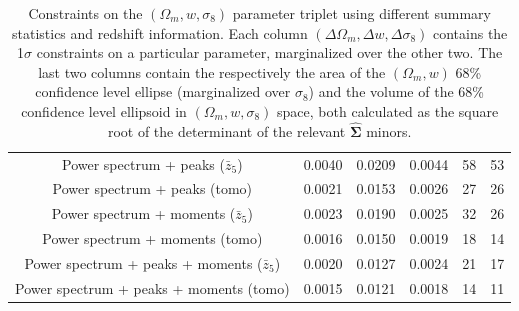 \documentclass[reprint,aps,prd,superscriptaddress,showkeys,showpacs]{revtex4-1}
\newcommand{\bbh}[1]{\mathbf{\hat{#1}}}
\begin{document}
\begin{table}
\begin{tabular}{c|c|c|c|c|c|}
           Power spectrum + peaks ($\bar{z}_5$) &            0.0040 &     0.0209 &            0.0044 &                            58 &                                         53 \\
                  Power spectrum + peaks (tomo) &            0.0021 &     0.0153 &            0.0026 &                            27 &                                         26 \\
         Power spectrum + moments ($\bar{z}_5$) &            0.0023 &     0.0190 &            0.0025 &                            32 &                                         26 \\
                Power spectrum + moments (tomo) &            0.0016 &     0.0150 &            0.0019 &                            18 &                                         14 \\
 Power spectrum + peaks + moments ($\bar{z}_5$) &            0.0020 &     0.0127 &            0.0024 &                            21 &                                         17 \\
        Power spectrum + peaks + moments (tomo) &            0.0015 &     0.0121 &            0.0018 &                            14 &                                         11 \\ \hline
\bottomrule
\end{tabular}
\caption{Constraints on the $(\Omega_m,w,\sigma_8)$ parameter triplet using different summary statistics and redshift information. Each column $(\Delta \Omega_m,\Delta w,\Delta \sigma_8)$ contains the 1$\sigma$ constraints on a particular parameter, marginalized over the other two. The last two columns contain the respectively the area of the $(\Omega_m,w)$ 68\% confidence level ellipse (marginalized over $\sigma_8$) and the volume of the 68\% confidence level ellipsoid in $(\Omega_m,w,\sigma_8)$ space, both calculated as the square root of the determinant of the relevant $\bbh{\Sigma}$ minors.}
\label{tbl:constraints}
\end{table}
\end{document}
